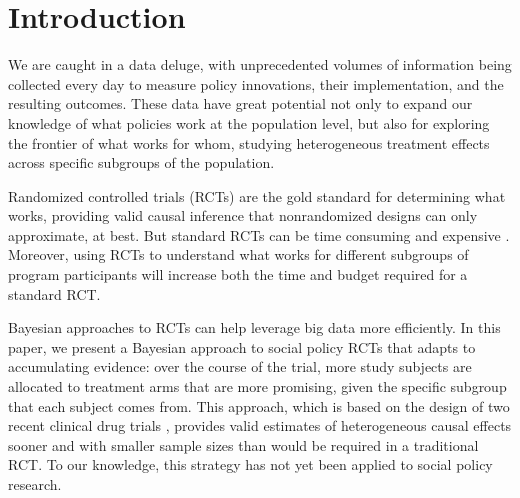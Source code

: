 \documentclass{acm_proc_article-sp}
\begin{document}


\section{Introduction}
We are caught in a data deluge, with unprecedented volumes of information being collected every day to measure policy innovations, their implementation, and the resulting outcomes. 
These data have great potential not only to expand our knowledge of what policies work at the population level, but also for exploring the frontier of what works for whom, studying heterogeneous treatment effects across specific subgroups of the population.

Randomized controlled trials (RCTs) are the gold standard for determining what works, providing valid causal inference that nonrandomized designs can only approximate, at best. But standard RCTs can be time consuming and expensive \cite{luce2009rethinking}. 
Moreover, using RCTs to understand what works for different subgroups of program participants will increase both the time and budget required for a standard RCT. 

Bayesian approaches to RCTs can help leverage big data more efficiently. 
In this paper, we present a Bayesian approach to social policy RCTs that adapts to accumulating evidence: over the course of the trial, more study subjects are allocated to treatment arms that are more promising, given the specific subgroup that each subject comes from. 
This approach, which is based on the design of two recent clinical drug trials \cite{barker2009spy, kim2011battle}, provides valid estimates of heterogeneous causal effects sooner and with smaller sample sizes than would be required in a traditional RCT. 
To our knowledge, this strategy has not yet been applied to social policy research. 
\end{document}
